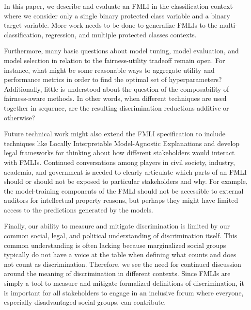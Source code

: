 \documentclass{acm_proc_article-sp}
\begin{document}
In this paper, we describe and evaluate an FMLI in the classification context
where we consider only a single binary protected class variable and a binary
target variable. More work needs to be done to generalize FMLIs to the multi-
classification, regression, and multiple protected classes contexts.

Furthermore, many basic questions about model tuning, model evaluation, and
model selection in relation to the fairness-utility tradeoff remain open. For
instance, what might be some reasonable ways to aggregate utility and
performance metrics in order to find the optimal set of hyperparameters?
Additionally, little is understood about the question of the composability of
fairness-aware methods. In other words, when different techniques are used
together in sequence, are the resulting discrimination reductions additive or
otherwise?

Future technical work might also extend the FMLI specification to include
techniques like Locally Interpretable Model-Agnostic Explanations
\cite{ribeiro2016should} and develop legal frameworks for thinking about how
different stakeholders would interact with FMLIs. Continued conversations among
players in civil society, industry, academia, and government is needed to
clearly articulate which parts of an FMLI should or should not be exposed to
particular stakeholders and why. For example, the model-training components
of the FMLI should not be accessible to external auditors for intellectual
property reasons, but perhaps they might have limited access to the predictions
generated by the models.

Finally, our ability to measure and mitigate discrimination is limited by our
common social, legal, and political understanding of discrimination itself. This
common understanding is often lacking because marginalized social groups
typically do not have a voice at the table when defining what counts and does
not count as discrimination. Therefore, we see the need for continued discussion
around the meaning of discrimination in different contexts. Since FMLIs are
simply a tool to measure and mitigate formalized definitions of discrimination,
it is important for all stakeholders to engage in an inclusive forum where
everyone, especially disadvantaged social groups, can contribute.

\nocite{*}


\end{document}

